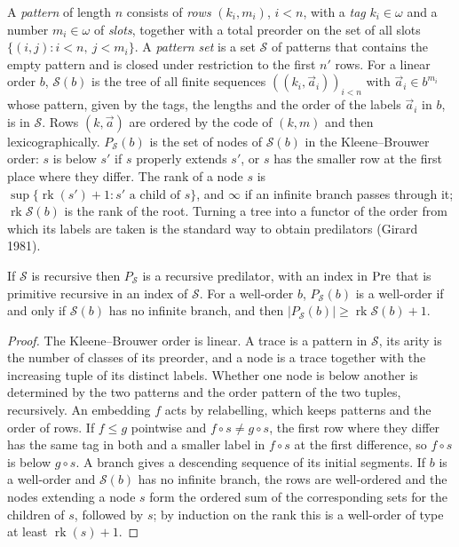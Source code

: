 \documentclass[11pt]{article}
\begin{document}
A \emph{pattern} of length $n$ consists of \emph{rows} $(k_i, m_i)$, $i < n$, with a \emph{tag} $k_i \in \omega$ and a
number $m_i \in \omega$ of \emph{slots}, together with a total preorder on the set of all slots
$\{(i, j) : i < n,\ j < m_i\}$. A \emph{pattern set} is a set $\mathcal S$ of patterns that contains the
empty pattern and is closed under restriction to the first $n'$ rows. For a linear order $b$, $\mathcal S(b)$ is the tree of all finite sequences
$((k_i, \vec a_i))_{i < n}$ with $\vec a_i \in b^{m_i}$ whose pattern, given by the tags, the lengths and the order
of the labels $\vec a_i$ in $b$, is in $\mathcal S$. Rows $(k, \vec a)$ are ordered by the code of $(k, m)$ and
then lexicographically. $P_{\mathcal S}(b)$ is the set of nodes of $\mathcal S(b)$ in the Kleene--Brouwer order:
$s$ is below $s'$ if $s$ properly extends $s'$, or $s$ has the smaller row at the first place where they differ.
The rank of a node $s$ is $\sup\{\operatorname{rk}(s') + 1 : s' \text{ a child of } s\}$, and $\infty$ if an infinite
branch passes through it; $\operatorname{rk} \mathcal S(b)$ is the rank of the root. Turning a tree into a functor of the order
from which its labels are taken is the standard way to obtain predilators (Girard 1981).

\begin{statement} If $\mathcal S$ is recursive then $P_{\mathcal S}$ is a recursive predilator, with
an index in $\mathrm{Pre}$ that is primitive recursive in an index of $\mathcal S$. For a well-order $b$, $P_{\mathcal S}(b)$
is a well-order if and only if $\mathcal S(b)$ has no infinite branch, and then
$|P_{\mathcal S}(b)| \ge \operatorname{rk} \mathcal S(b) + 1$.
\end{statement}

\begin{proof} The Kleene--Brouwer order is linear. A trace is a pattern in $\mathcal S$, its arity is the number of
classes of its preorder, and a node is a trace together with the increasing tuple of its distinct labels. Whether
one node is below another is determined by the two patterns and the order pattern of the two tuples, recursively.
An embedding $f$ acts by relabelling, which keeps patterns and the order of rows. If $f \le g$ pointwise and
$f \circ s \ne g \circ s$, the first row where they differ has the same tag in both and a smaller label in
$f \circ s$ at the first difference, so $f \circ s$ is below $g \circ s$. A branch gives a descending sequence of
its initial segments. If $b$ is a well-order and $\mathcal S(b)$ has no infinite branch, the rows are well-ordered
and the nodes extending a node $s$ form the ordered sum of the corresponding sets for the children of $s$, followed
by $s$; by induction on the rank this is a well-order of type at least $\operatorname{rk}(s) + 1$.
\end{proof}
\end{document}
